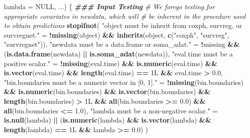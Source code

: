 \documentclass[
]{book}
\newenvironment{Shaded}{\begin{snugshade}}{\end{snugshade}}
\newcommand{\AttributeTok}[1]{\textcolor[rgb]{0.13,0.29,0.53}{#1}}
\newcommand{\CommentTok}[1]{\textcolor[rgb]{0.56,0.35,0.01}{\textit{#1}}}
\newcommand{\ConstantTok}[1]{\textcolor[rgb]{0.56,0.35,0.01}{#1}}
\newcommand{\DocumentationTok}[1]{\textcolor[rgb]{0.56,0.35,0.01}{\textbf{\textit{#1}}}}
\newcommand{\FloatTok}[1]{\textcolor[rgb]{0.00,0.00,0.81}{#1}}
\newcommand{\FunctionTok}[1]{\textcolor[rgb]{0.13,0.29,0.53}{\textbf{#1}}}
\newcommand{\NormalTok}[1]{#1}
\newcommand{\OtherTok}[1]{\textcolor[rgb]{0.56,0.35,0.01}{#1}}
\newcommand{\SpecialCharTok}[1]{\textcolor[rgb]{0.81,0.36,0.00}{\textbf{#1}}}
\newcommand{\StringTok}[1]{\textcolor[rgb]{0.31,0.60,0.02}{#1}}
\begin{document}
\begin{Shaded}
\begin{Highlighting}[]
                         \AttributeTok{lambda =} \ConstantTok{NULL}\NormalTok{, ...) \{ }
  \DocumentationTok{\#\#\# Input Testing}
  \CommentTok{\# We forego testing for appropriate covariates in \textasciigrave{}newdata\textasciigrave{}, which will}
  \CommentTok{\#   be inherent in the procedure used to obtain predictions}
  \FunctionTok{stopifnot}\NormalTok{(}
    \StringTok{"\textasciigrave{}object\textasciigrave{} must be inherit from \textasciigrave{}coxph\textasciigrave{}, \textasciigrave{}survreg\textasciigrave{}, or \textasciigrave{}survregnet\textasciigrave{}."} \OtherTok{=}
      \SpecialCharTok{!}\FunctionTok{missing}\NormalTok{(object) }\SpecialCharTok{\&\&} \FunctionTok{inherits}\NormalTok{(object, }\FunctionTok{c}\NormalTok{(}\StringTok{"coxph"}\NormalTok{, }\StringTok{"survreg"}\NormalTok{, }\StringTok{"survregnet"}\NormalTok{)),}
    \StringTok{"\textasciigrave{}newdata\textasciigrave{} must be a data.frame or soma\_adat."} \OtherTok{=} 
      \SpecialCharTok{!}\NormalTok{missing }\SpecialCharTok{\&\&}\NormalTok{ (}\FunctionTok{is.data.frame}\NormalTok{(newdata) }\SpecialCharTok{||} \FunctionTok{is.soma\_adat}\NormalTok{(newdata)),}
    \StringTok{"\textasciigrave{}eval.time\textasciigrave{} must be a positive scalar."} \OtherTok{=} 
      \SpecialCharTok{!}\FunctionTok{missing}\NormalTok{(eval.time) }\SpecialCharTok{\&\&} \FunctionTok{is.numeric}\NormalTok{(eval.time) }\SpecialCharTok{\&\&} 
      \FunctionTok{is.vector}\NormalTok{(eval.time) }\SpecialCharTok{\&\&} \FunctionTok{length}\NormalTok{(eval.time) }\SpecialCharTok{==}\NormalTok{ 1L }\SpecialCharTok{\&\&}\NormalTok{ eval.time }\SpecialCharTok{\textgreater{}} \FloatTok{0.0}\NormalTok{,}
    \StringTok{"\textasciigrave{}bin.boundaries\textasciigrave{} must be a numeric vector in [0, 1]."} \OtherTok{=} 
      \SpecialCharTok{!}\FunctionTok{missing}\NormalTok{(bin.boundaries) }\SpecialCharTok{\&\&} \FunctionTok{is.numeric}\NormalTok{(bin.boundaries) }\SpecialCharTok{\&\&} 
      \FunctionTok{is.vector}\NormalTok{(bin.boundaries) }\SpecialCharTok{\&\&} \FunctionTok{length}\NormalTok{(bin.boundaries) }\SpecialCharTok{\textgreater{}}\NormalTok{ 1L }\SpecialCharTok{\&\&} 
      \FunctionTok{all}\NormalTok{(bin.boundaries }\SpecialCharTok{\textgreater{}=} \FloatTok{0.0}\NormalTok{) }\SpecialCharTok{\&\&} \FunctionTok{all}\NormalTok{(bin.boundaries }\SpecialCharTok{\textless{}=} \FloatTok{1.0}\NormalTok{),}
    \StringTok{"\textasciigrave{}lambda\textasciigrave{} must be a non{-}negative scalar."} \OtherTok{=} 
      \FunctionTok{is.null}\NormalTok{(lambda) }\SpecialCharTok{||}\NormalTok{ (}\FunctionTok{is.numeric}\NormalTok{(lambda) }\SpecialCharTok{\&\&} \FunctionTok{is.vector}\NormalTok{(lambda) }\SpecialCharTok{\&\&}
                          \FunctionTok{length}\NormalTok{(lambda) }\SpecialCharTok{==}\NormalTok{ 1L }\SpecialCharTok{\&\&}\NormalTok{ lambda }\SpecialCharTok{\textgreater{}=} \FloatTok{0.0}\NormalTok{)}
\NormalTok{  )}
  

\end{Highlighting}
\end{Shaded}
\end{document}
